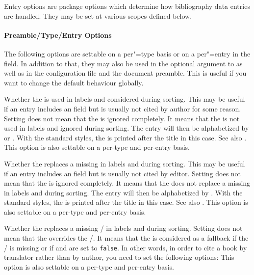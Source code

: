 \documentclass{ltxdockit}[2011/03/25]
\begin{document}
Entry options are package options which determine how bibliography data entries are handled. They may be set at various scopes defined below.

\paragraph{Preamble/Type/Entry Options}
\label{use:opt:bib:hyb}

The following options are settable on a per"=type basis or on a per"=entry in the  field. In addition to that, they may also be used in the optional argument to  as well as in the configuration file and the document preamble. This is useful if you want to change the default behaviour globally.

\begin{optionlist}


Whether the  is used in labels and considered during sorting. This may be useful if an entry includes an  field but is usually not cited by author for some reason. Setting  does not mean that the  is ignored completely. It means that the  is not used in labels and ignored during sorting. The entry will then be alphabetized by  or . With the standard styles, the  is printed after the title in this case. See also .
This option is also settable on a per-type and per-entry basis.


Whether the  replaces a missing  in labels and during sorting. This may be useful if an entry includes an  field but is usually not cited by editor. Setting  does not mean that the  is ignored completely. It means that the  does not replace a missing  in labels and during sorting. The entry will then be alphabetized by . With the standard styles, the  is printed after the title in this case. See also .
This option is also settable on a per-type and per-entry basis.


Whether the  replaces a missing \slash {} in labels and during sorting. Setting  does not mean that the  overrides the \slash {}. It means that the  is considered as a fallback if the \slash {} is missing or if  and  are set to \texttt{false}. In other words, in order to cite a book by translator rather than by author, you need to set the following options:
This option is also settable on a per-type and per-entry basis.


\end{optionlist}
\end{document}
